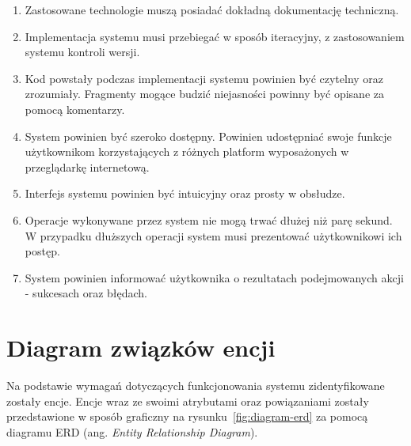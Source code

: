 \begin{enumerate}

\item Zastosowane technologie muszą posiadać dokładną dokumentację techniczną.

\item Implementacja systemu musi przebiegać w sposób iteracyjny, z zastosowaniem systemu kontroli wersji.

\item Kod powstały podczas implementacji systemu powinien być czytelny oraz zrozumiały. Fragmenty mogące budzić niejasności powinny być opisane za pomocą komentarzy.

\item System powinien być szeroko dostępny. Powinien udostępniać swoje funkcje użytkownikom korzystających z różnych platform wyposażonych w przeglądarkę internetową. 

\item Interfejs systemu powinien być intuicyjny oraz prosty w obsłudze.

\item Operacje wykonywane przez system nie mogą trwać dłużej niż parę sekund. W przypadku dłuższych operacji system musi prezentować użytkownikowi ich postęp.

\item System powinien informować użytkownika o rezultatach podejmowanych akcji - sukcesach oraz błędach.

\end{enumerate}


\section{Diagram związków encji}

Na podstawie wymagań dotyczących funkcjonowania systemu zidentyfikowane zostały encje. Encje wraz ze swoimi atrybutami oraz powiązaniami zostały przedstawione w sposób graficzny na rysunku~\ref{fig:diagram-erd} za pomocą diagramu ERD (ang. \textit{Entity Relationship Diagram}).

